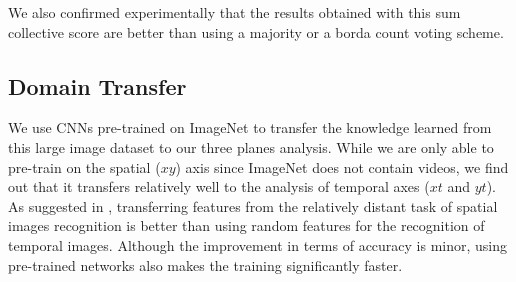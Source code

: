 \documentclass[a4paper,11pt]{article}
\begin{document}
We also confirmed experimentally that the results obtained with this sum collective score are better than using a majority or a borda count voting scheme.



\subsection{Domain Transfer}%
We use CNNs pre-trained on ImageNet to transfer the knowledge learned from this large image dataset to our three planes analysis.
While we are only able to pre-train on the spatial ($xy$) axis since ImageNet does not contain videos, we find out that it transfers relatively well to the analysis of temporal axes ($xt$ and $yt$).
As suggested in \cite{yosinski2014transferable}, transferring features from the relatively distant task of spatial images recognition is better than using random features for the recognition of temporal images.
Although the improvement in terms of accuracy is minor, using pre-trained networks also makes the training significantly faster.
\end{document}
